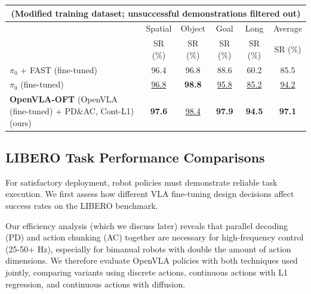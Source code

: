 \documentclass[conference]{IEEEtran}
\begin{document}
\begin{table}[t]
{\begin{tabular}{l|c|c|c|c|c}
\multicolumn{6}{c}{(Modified training dataset; unsuccessful demonstrations filtered out)} \\
\midrule
& Spatial & Object & Goal & Long & Average \\
& SR (\%) & SR (\%) & SR (\%) & SR (\%) & SR (\%) \\
\midrule
$\pi_0$ + FAST (fine-tuned) \citep{pertsch2025fastefficientactiontokenization} & 96.4 & 96.8 & 88.6 & 60.2 & 85.5 \\
$\pi_0$ (fine-tuned) \citep{black2024pi_0} & \underline{96.8} & \textbf{98.8} & \underline{95.8} & \underline{85.2} & \underline{94.2} \\
\textbf{OpenVLA-OFT} (OpenVLA (fine-tuned) + PD\&AC, Cont-L1) (ours) & \textbf{97.6} & \underline{98.4} & \textbf{97.9} & \textbf{94.5} & \textbf{97.1}  \\
\bottomrule
\end{tabular}}
\vspace{-0.2cm}
\end{table}









\subsection{LIBERO Task Performance Comparisons}

For satisfactory deployment, robot policies must demonstrate reliable task execution. We first assess how different VLA fine-tuning design decisions affect success rates on the LIBERO benchmark.

Our efficiency analysis (which we discuss later) reveals that parallel decoding (PD) and action chunking (AC) together are necessary for high-frequency control (25-50+ Hz), especially for bimanual robots with double the amount of action dimensions. We therefore evaluate OpenVLA policies with both techniques used jointly, comparing variants using discrete actions, continuous actions with L1 regression, and continuous actions with diffusion.
\end{document}
